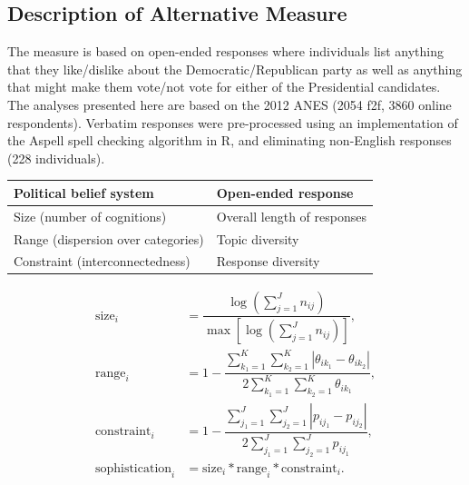 \documentclass[a0,landscape]{a0poster}
\begin{document}
\begin{multicols}{4}
\color{Black} %
\section*{Description of Alternative Measure}

The measure is based on open-ended responses where individuals list anything that they like/dislike about the Democratic/Republican party as well as anything that might make them vote/not vote for either of the Presidential candidates. The analyses presented here are based on the 2012 ANES (2054 f2f, 3860 online respondents). Verbatim responses were pre-processed using an implementation of the Aspell spell checking algorithm in R, and eliminating non-English responses (228 individuals). 
\vspace{1em}

\begin{center}
\begin{tabular}{p{15cm}p{10cm}}
\toprule 
Political belief system & Open-ended response \\
\midrule
Size (number of cognitions) & Overall length of responses \\
Range (dispersion over categories) & Topic diversity \\
Constraint (interconnectedness) & Response diversity \\
\bottomrule
\end{tabular}
\end{center}

\begin{align}
\text{size}_i &= \dfrac{\log\left(\sum_{j=1}^J n_{ij}\right)}{\max\left[\log\left(\sum_{j=1}^J n_{ij}\right)\right]},\\
\text{range}_i &= 1-\dfrac{\sum_{k_1=1}^K\sum_{k_2=1}^K |\theta_{ik_1} - \theta_{ik_2}|}{2\sum_{k_1=1}^K\sum_{k_2=1}^K \theta_{ik_1}},\\
\text{constraint}_i &= 1-\dfrac{\sum_{j_1=1}^J\sum_{j_2=1}^J |p_{ij_1} - p_{ij_2}|}{2\sum_{j_1=1}^J\sum_{j_2=1}^J p_{ij_1}},\\
\text{sophistication}_i &= \text{size}_i * \text{range}_i * \text{constraint}_i.
\end{align}


\end{multicols}
\end{document}
